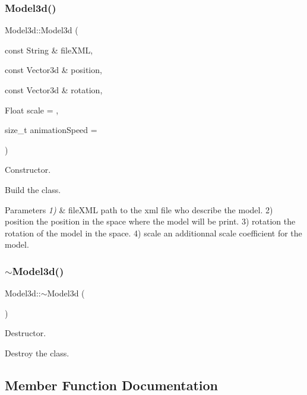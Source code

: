 \subsubsection{\texorpdfstring{Model3d()}{Model3d()}}
{\footnotesize\ttfamily Model3d\+::\+Model3d (\begin{DoxyParamCaption}\item[{const String \&}]{file\+X\+ML,  }\item[{const Vector3d \&}]{position,  }\item[{const Vector3d \&}]{rotation,  }\item[{Float}]{scale = {},  }\item[{size\+\_\+t}]{animation\+Speed = {} }\end{DoxyParamCaption})}



Constructor. 

Build the class.


\begin{DoxyParams}{Parameters}
{\em 1)} & \textquotesingle{}file\+X\+ML\textquotesingle{} path to the xml file who describe the model. 2) \textquotesingle{}position\textquotesingle{} the position in the space where the model will be print. 3) \textquotesingle{}rotation\textquotesingle{} the rotation of the model in the space. 4) \textquotesingle{}scale\textquotesingle{} an additionnal scale coefficient for the model. \\
\hline
\end{DoxyParams}
\mbox{\label{classModel3d_a7a4ec3be34c901538574d99d95a46b04}} 
\subsubsection{\texorpdfstring{$\sim$\+Model3d()}{~Model3d()}}
{\footnotesize\ttfamily Model3d\+::$\sim$\+Model3d (\begin{DoxyParamCaption}{ }\end{DoxyParamCaption})}



Destructor. 

Destroy the class. 

\subsection{Member Function Documentation}
\mbox{\label{classModel3d_ae02d86ac82ec9f435cf1ebe668f3a6dd}} 
